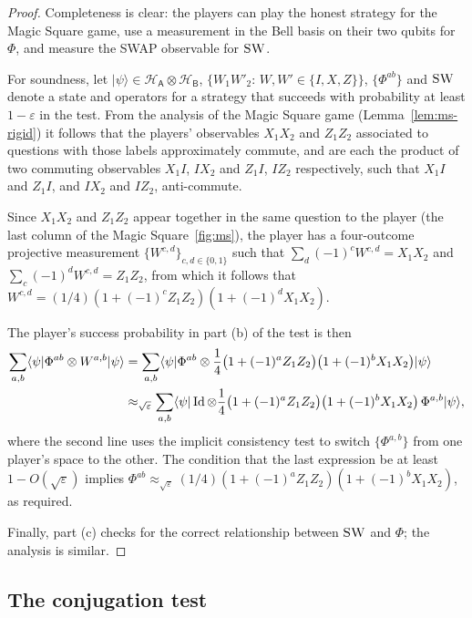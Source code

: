 \documentclass[11pt]{article}
\theoremstyle{remark}
\theoremstyle{definition}
\newcommand{\ket}[1]{|#1\rangle}
\newcommand{\bra}[1]{\langle#1|}
\newcommand{\Id}{\ensuremath{\mathop{\rm Id}\nolimits}}
\newcommand{\reg}[1]{{\textsf{#1}}}
\newcommand{\mH}{\mathcal{H}}
\newcommand{\eps}{\varepsilon}
\newcommand{\SWAP}{\textsc{SW}}
\begin{document}
\begin{proof}
Completeness is clear: the players can play the honest strategy for the Magic Square game, use a measurement in the Bell basis on their two qubits for $\Phi$, and measure the SWAP observable for $\SWAP$. 

For soundness, let $\ket{\psi}\in\mH_\reg{A}\otimes \mH_\reg{B}$, $\{W_1W'_2:\, W,W'\in\{I,X,Z\}\}$, $\{\Phi^{ab}\}$ and $\SWAP$ denote a state and operators for a strategy that succeeds with probability at least $1-\eps$ in the test. From the analysis of the Magic Square game (Lemma~\ref{lem:ms-rigid}) it follows that the players' observables $X_1X_2$ and $Z_1Z_2$ associated to questions with those  labels approximately commute, and are each the product of two commuting observables $X_1I$, $IX_2$ and $Z_1I$, $IZ_2$ respectively, such that $X_1I$ and $Z_1I$, and $IX_2$ and $IZ_2$, anti-commute. 

Since $X_1X_2$ and $Z_1Z_2$ appear together in the same question to the player (the last column of the Magic Square~\ref{fig:ms}), the player has a four-outcome projective measurement $\{W^{c,d}\}_{c,d\in\{0,1\}}$ such that $\sum_d (-1)^c W^{c,d} = X_1X_2$ and $\sum_c (-1)^dW^{c,d} = Z_1Z_2$, from which it follows that $W^{c,d} = (1/4)(1+(-1)^c Z_1Z_2)(1+(-1)^d X_1X_2)$. 

The player's success probability in part (b) of the test is then
\begin{align*}
\sum_{a,b} \bra{\psi} \Phi^{ab} \otimes W^{a,b} \ket{\psi} &= \sum_{a,b} \bra{\psi} \Phi^{ab} \otimes \frac{1}{4} \big(1+(-1)^a Z_1Z_2\big)\big(1+(-1)^bX_1X_2\big) \ket{\psi}\\
&\approx_{\sqrt{\eps}} \sum_{a,b} \bra{\psi} \Id \otimes \frac{1}{4} \big(1+(-1)^a Z_1Z_2\big)\big(1+(-1)^bX_1X_2\big)\,\Phi^{a,b} \ket{\psi},
\end{align*}
where the second line uses the implicit consistency test to switch $\{\Phi^{a,b}\}$ from one player's space to the other. The condition that the last expression be at least $1-O(\sqrt{\eps})$ implies 
$\Phi^{ab} \approx_{\sqrt{\eps}}(1/4)(1+(-1)^a Z_1Z_2)(1+(-1)^bX_1X_2)$, as required. 

Finally, part (c) checks for the correct relationship between $\SWAP$ and $\Phi$; the analysis is similar.  
\end{proof}


\subsection{The conjugation test}
\label{sec:conj-test}
\end{document}
